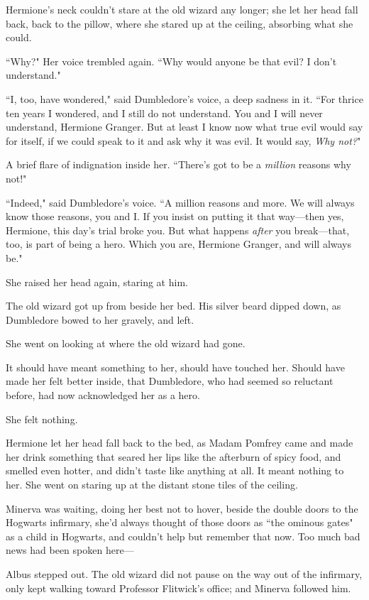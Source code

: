 Hermione's neck couldn't stare at the old wizard any longer; she let her head fall back, back to the pillow, where she stared up at the ceiling, absorbing what she could.

``Why?" Her voice trembled again. ``Why would anyone be that evil? I don't understand."

``I, too, have wondered," said Dumbledore's voice, a deep sadness in it. ``For thrice ten years I wondered, and I still do not understand. You and I will never understand, Hermione Granger. But at least I know now what true evil would say for itself, if we could speak to it and ask why it was evil. It would say, \emph{Why not?}"

A brief flare of indignation inside her. ``There's got to be a \emph{million} reasons why not!"

``Indeed," said Dumbledore's voice. ``A million reasons and more. We will always know those reasons, you and I\@. If you insist on putting it that way—then yes, Hermione, this day's trial broke you. But what happens \emph{after} you break—that, too, is part of being a hero. Which you are, Hermione Granger, and will always be."

She raised her head again, staring at him.

The old wizard got up from beside her bed. His silver beard dipped down, as Dumbledore bowed to her gravely, and left.

She went on looking at where the old wizard had gone.

It should have meant something to her, should have touched her. Should have made her felt better inside, that Dumbledore, who had seemed so reluctant before, had now acknowledged her as a hero.

She felt nothing.

Hermione let her head fall back to the bed, as Madam Pomfrey came and made her drink something that seared her lips like the afterburn of spicy food, and smelled even hotter, and didn't taste like anything at all. It meant nothing to her. She went on staring up at the distant stone tiles of the ceiling.

\later

Minerva was waiting, doing her best not to hover, beside the double doors to the Hogwarts infirmary, she'd always thought of those doors as ``the ominous gates" as a child in Hogwarts, and couldn't help but remember that now. Too much bad news had been spoken here—

Albus stepped out. The old wizard did not pause on the way out of the infirmary, only kept walking toward Professor Flitwick's office; and Minerva followed him.

